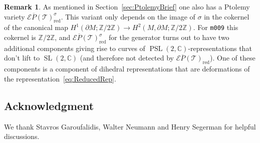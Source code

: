 \documentclass[11pt]{amsart}
\theoremstyle{plain}
\theoremstyle{definition}
\newtheorem{remark}[theorem]{Remark}
\numberwithin{equation}{section}
\newcommand{\Z}{\mathbb Z}
\newcommand{\C}{\mathbb C}
\newcommand{\T}{\mathcal T}
\newcommand{\E}{\mathcal E}
\DeclareMathOperator{\PSL}{PSL}
\DeclareMathOperator{\SL}{SL}
\DeclareMathOperator{\red}{red}
\begin{document}
\begin{remark}\label{rm:EnhancedPSLExample}
As mentioned in Section~\ref{sec:PtolemyBrief} one also has a Ptolemy variety $\E\overline P(\T)^\sigma_{\red}$. This variant only depends on the image of $\sigma$ in the cokernel of the canonical map $H^1(\partial M;\Z/2\Z)\to H^2(M,\partial M;\Z/2\Z)$. For \texttt{m009} this cokernel is $\Z/2\Z$, and $\E\overline P(\T)^\sigma_{\red}$ for the generator turns out to have two additional components giving rise to curves of $\PSL(2,\C)$-representations that don't lift to $\SL(2,\C)$ (and therefore not detected by $\E\overline P(\T)_{\red}$). One of these components is a component of dihedral representations that are deformations of the representation~\eqref{eq:ReducedRep}. 
\end{remark}





\subsection*{Acknowledgment}
We thank Stavros Garoufalidis, Walter Neumann and Henry Segerman for helpful discussions.



\end{document}
